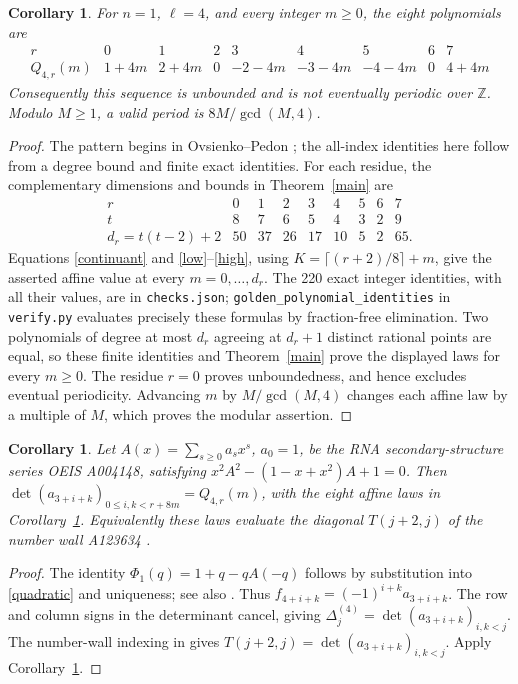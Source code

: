 \documentclass[11pt,a4paper]{article}
\newcommand{\Z}{\mathbb Z}
\newcommand{\D}[2]{\Delta_{#1}^{(#2)}}
\newtheorem{corollary}[theorem]{Corollary}
\begin{document}
\begin{corollary}\label{golden}
For $n=1$, $\ell=4$, and every integer $m\ge0$, the eight polynomials are
\[
\begin{array}{c|rrrrrrrr}
r&0&1&2&3&4&5&6&7\\\hline
Q_{4,r}(m)&1+4m&2+4m&0&-2-4m&-3-4m&-4-4m&0&4+4m
\end{array}
\]
Consequently this sequence is unbounded and is not eventually periodic
over $\Z$. Modulo $M\ge1$, a valid period is $8M/\gcd(M,4)$.
\end{corollary}
\begin{proof}
The pattern begins in Ovsienko--Pedon \cite[p.~8, (1.18)]{OP}; the
all-index identities here follow from a degree bound and finite exact
identities. For each residue, the complementary dimensions and bounds
in Theorem~\ref{main} are
\[
\begin{array}{c|rrrrrrrr}
r&0&1&2&3&4&5&6&7\\\hline
t&8&7&6&5&4&3&2&9\\
d_r=t(t-2)+2&50&37&26&17&10&5&2&65.
\end{array}
\]
Equations \eqref{continuant} and \eqref{low}--\eqref{high}, using
$K=\lceil(r+2)/8\rceil+m$, give the asserted affine value at every
$m=0,\ldots,d_r$. The 220 exact integer identities, with all their values,
are in \texttt{checks.json}; \texttt{golden\_polynomial\_identities} in
\texttt{verify.py} evaluates precisely these formulas by fraction-free
elimination. Two polynomials of degree at most $d_r$ agreeing at $d_r+1$
distinct rational points are equal, so these finite identities and
Theorem~\ref{main} prove the displayed laws for every $m\ge0$.
The residue $r=0$ proves unboundedness, and hence excludes eventual
periodicity. Advancing $m$ by $M/\gcd(M,4)$ changes each affine law by a
multiple of $M$, which proves the modular assertion.
\end{proof}

\begin{corollary}\label{rna}
Let $A(x)=\sum_{s\ge0}a_sx^s$, $a_0=1$, be the RNA secondary-structure
series \textup{OEIS A004148}, satisfying
$x^2A^2-(1-x+x^2)A+1=0$.
Then $\det(a_{3+i+k})_{0\le i,k<r+8m}=Q_{4,r}(m)$, with the eight
affine laws in Corollary~\ref{golden}. Equivalently these laws evaluate
the diagonal $T(j+2,j)$ of the number wall \textup{A123634} \cite{OEISwall}.
\end{corollary}
\begin{proof}
The identity $\Phi_1(q)=1+q-qA(-q)$ follows by substitution into
\eqref{quadratic} and uniqueness; see also \cite[(1.6)--(1.8)]{Pedon}.
Thus $f_{4+i+k}=(-1)^{i+k}a_{3+i+k}$. The row and column signs in
the determinant cancel, giving $\D j4=\det(a_{3+i+k})_{i,k<j}$.
The number-wall indexing in \cite{OEISwall} gives
$T(j+2,j)=\det(a_{3+i+k})_{i,k<j}$. Apply Corollary~\ref{golden}.
\end{proof}
\end{document}
